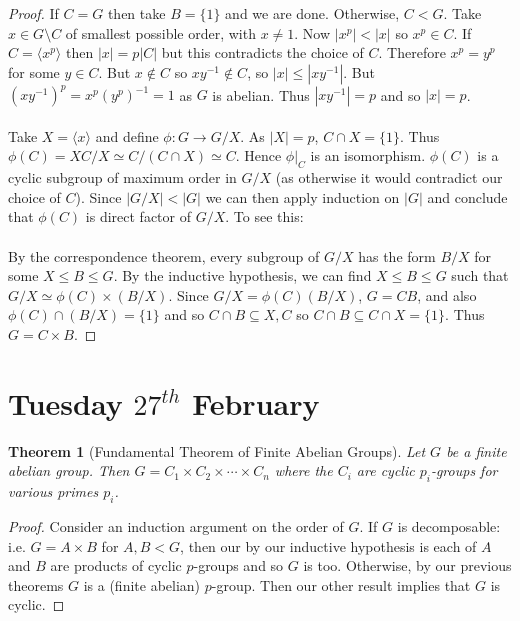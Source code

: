 \documentclass[a4paper,10pt]{article}
\newtheorem{thm}{Theorem}
\begin{document}
\begin{proof}
If $C = G$ then take $B = \{1\}$ and we are done. Otherwise, $C < G$. Take $x \in G \setminus C$ of smallest possible order, with $x \neq 1$. Now $|x^p| < |x|$ so $x^p \in C$. If $C = \langle x^p \rangle $ then $|x| = p|C|$ but this contradicts the choice of $C$. Therefore $x^p = y^p$ for some $y \in C$. But $x \notin C$ so $xy^{-1} \notin C$, so $|x| \leq |xy^{-1}|$. But $(xy^{-1})^p = x^p (y^p)^{-1} = 1$ as $G$ is abelian. Thus $|xy^{-1}| = p$ and so $|x| = p$. \\
\\
Take $X = \langle x \rangle$ and define $\phi : G \rightarrow G / X$. As $|X| = p$, $C \cap X = \{1\}$. Thus $\phi(C) = XC / X \simeq C / (C \cap X) \simeq C$. Hence $\phi |_C$ is an isomorphism. $\phi(C)$ is a cyclic subgroup of maximum order in $G / X$ (as otherwise it would contradict our choice of $C$). Since $|G / X| < |G|$ we can then apply induction on $|G|$ and conclude that $\phi(C)$ is direct factor of $G / X$. To see this: \\
\\
By the correspondence theorem, every subgroup of $G / X$ has the form $B / X$ for some $X \leq B \leq G$. By the inductive hypothesis, we can find $X \leq B \leq G$ such that $G / X \simeq \phi(C) \times (B / X)$. Since $G / X = \phi(C) (B / X)$, $G  = CB$, and also $\phi(C) \cap (B/X) = \{1\}$ and so $C \cap B \subseteq X, C$ so $C \cap B \subseteq C \cap X = \{ 1 \}$. Thus $G = C \times B$.  
\end{proof}



\newpage
\section{Tuesday $27^{th}$ February}

\begin{thm}[Fundamental Theorem of Finite Abelian Groups]
Let $G$ be a finite abelian group. Then $G = C_1 \times C_2 \times \cdots \times  C_n$ where the $C_i$ are cyclic $p_i$-groups for various primes $p_i$. 
\end{thm}

\begin{proof}
Consider an induction argument on the order of $G$. If $G$ is decomposable: i.e. $G = A \times B$ for $A,B < G$, then our by our inductive hypothesis is each of $A$ and $B$ are products of cyclic $p$-groups and so $G$ is too. Otherwise, by our previous theorems $G$ is a (finite abelian) $p$-group. Then our other result implies that $G$ is cyclic.
\end{proof}
\end{document}

